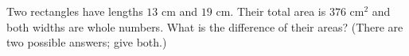Two rectangles have lengths $13$ cm and $19$ cm. Their total area is $376\text{ cm}^2$ and both widths are whole numbers. What is the difference of their areas? (There are two possible answers; give both.)
